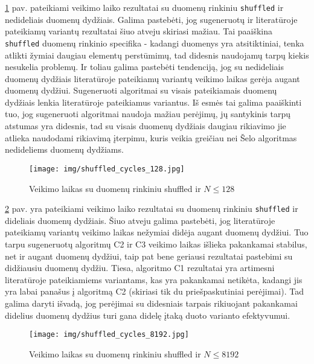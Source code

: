 \documentclass{VUMIFInfBakalaurinis}
\begin{document}
\ref{img:shuffled_cycles_128} pav. pateikiami veikimo laiko rezultatai su duomenų rinkiniu \verb|shuffled| ir nedideliais duomenų dydžiais.
Galima pastebėti, jog sugeneruotų ir literatūroje pateikiamų variantų rezultatai šiuo atveju skiriasi mažiau.
Tai paaiškina \verb|shuffled| duomenų rinkinio specifika - kadangi duomenys yra atsitiktiniai, tenka atlikti žymiai daugiau elementų perstūmimų,
tad didesnis naudojamų tarpų kiekis nesukelia problemų. 
Ir toliau galima pastebėti tendenciją, jog su nedideliais duomenų dydžiais literatūroje pateikiamų variantų veikimo laikas gerėja augant duomenų dydžiui.
Sugeneruoti algoritmai su visais pateikiamais duomenų dydžiais lenkia literatūroje pateikiamus variantus.
Iš esmės tai galima paaiškinti tuo, jog sugeneruoti algoritmai naudoja mažiau perėjimų, jų santykinis tarpų atstumas yra didesnis,
tad su visais duomenų dydžiais daugiau rikiavimo jie atlieka naudodami rikiavimą įterpimu, kuris veikia
greičiau nei Šelo algoritmas nedideliems duomenų dydžiams. %

\begin{figure}[H]
  \centering
  \texttt{[image: img/shuffled\_cycles\_128.jpg]}
  \caption{Veikimo laikas su duomenų rinkiniu shuffled ir $N \leq 128$}
  \label{img:shuffled_cycles_128}
\end{figure}

\ref{img:shuffled_cycles_8192} pav. yra pateikiami veikimo laiko rezultatai su duomenų rinkiniu \verb|shuffled| ir dideliais duomenų dydžiais.
Šiuo atveju galima pastebėti, jog literatūroje pateikiamų variantų veikimo laikas nežymiai didėja augant duomenų dydžiui.
Tuo tarpu sugeneruotų algoritmų C2 ir C3 veikimo laikas išlieka pakankamai stabilus, net ir augant duomenų dydžiui, taip pat
bene geriausi rezultatai pastebimi su didžiausiu duomenų dydžiu.
Tiesa, algoritmo C1 rezultatai yra artimesni literatūroje pateikiamiems variantams,
kas yra pakankamai netikėta, kadangi jis yra labai panašus į algoritmą C2 (skiriasi tik du priešpaskutiniai perėjimai).
Tad galima daryti išvadą, jog perėjimai su didesniais tarpais rikiuojant pakankamai didelius duomenų dydžius turi gana didelę įtaką duoto varianto efektyvumui.

\begin{figure}[H]
  \centering
  \texttt{[image: img/shuffled\_cycles\_8192.jpg]}
  \caption{Veikimo laikas su duomenų rinkiniu shuffled ir $N \leq 8192$}
  \label{img:shuffled_cycles_8192}
\end{figure}

\pagebreak
\end{document}
